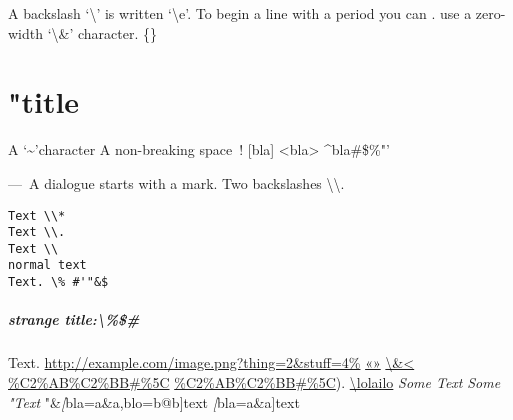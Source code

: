 A backslash `\textbackslash{}' is written `\textbackslash{}e'. To begin a line with a period you can
. use a zero-width `\textbackslash{}\&' character. \{\}

\chapter{"title}
\label{s:1}
A `\~{}'character
A non-breaking space~!
[bla]
<bla>
\^{}bla\#\$\%"'

—~A dialogue starts with a mark.
Two backslashes \textbackslash{}\textbackslash{}.

\begin{verbatim}
Text \\*
Text \\.
Text \\
normal text
Text. \% #'"&$
\end{verbatim}

\paragraph{strange title:\textbackslash{}\%\$\#}
Text.
\url{http://example.com/image.png?thing=2&stuff=4\%}
\href{example.com/image-\%C2\%AB\%C2\%BB.png}{«»}
\href{https://example.com/image.png?thing=3}{\textbackslash{}\&<}
\url{\%C2\%AB\%C2\%BB#\%5C}
\url{\%C2\%AB\%C2\%BB#\%5C}).
\hyperref[s:1]{\textbackslash{}lolailo}
\emph{Some     Text}
\emph{Some     "Text}
"\&\emph[bla=a\&a,blo=b@b]{text}
\emph[bla=a\&a]{text}

